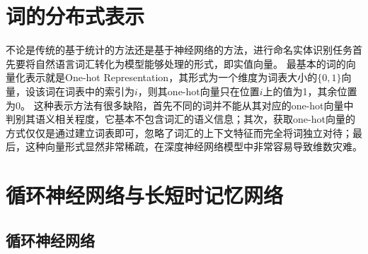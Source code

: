 \section{词的分布式表示}
不论是传统的基于统计的方法还是基于神经网络的方法，进行命名实体识别任务首先要将自然语言词汇转化为模型能够处理的形式，即实值向量。
最基本的词的向量化表示就是One-hot Representation，其形式为一个维度为词表大小的$\{0, 1\}$向量，设该词在词表中的索引为$i$，则其one-hot向量只在位置$i$上的值为1，其余位置为0。
这种表示方法有很多缺陷，首先不同的词并不能从其对应的one-hot向量中判别其语义相关程度，它基本不包含词汇的语义信息；其次，获取one-hot向量的方式仅仅是通过建立词表即可，忽略了词汇的上下文特征而完全将词独立对待；最后，这种向量形式显然非常稀疏，在深度神经网络模型中非常容易导致维数灾难。



\section{循环神经网络与长短时记忆网络}

\subsection{循环神经网络}
